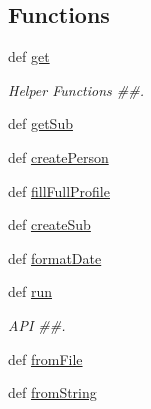 \subsection*{Functions}
\begin{DoxyCompactItemize}
\item 
def \hyperlink{namespacestudents_1_1linkedin__converter_a5b857dc4a26682e6e4112b430f85d0a1}{get}
\begin{DoxyCompactList}\small\item\em Helper Functions \#\#. \end{DoxyCompactList}\item 
def \hyperlink{namespacestudents_1_1linkedin__converter_a1b0420a55b9327dbde882ef39ec88c8d}{get\-Sub}
\item 
def \hyperlink{namespacestudents_1_1linkedin__converter_a508bd54255263358fc9b89c527b0be7f}{create\-Person}
\item 
def \hyperlink{namespacestudents_1_1linkedin__converter_a16da5f0b1783c410f527a823421de832}{fill\-Full\-Profile}
\item 
def \hyperlink{namespacestudents_1_1linkedin__converter_a9b47375845c60cee3339c9a402730503}{create\-Sub}
\item 
def \hyperlink{namespacestudents_1_1linkedin__converter_ae303061c29459c69df3dc09d6b495141}{format\-Date}
\item 
def \hyperlink{namespacestudents_1_1linkedin__converter_ae8ef886dcffd2847cd908b062a361ed6}{run}
\begin{DoxyCompactList}\small\item\em A\-P\-I \#\#. \end{DoxyCompactList}\item 
def \hyperlink{namespacestudents_1_1linkedin__converter_acbdadb1c069f1195fab80a95e41fad7e}{from\-File}
\item 
def \hyperlink{namespacestudents_1_1linkedin__converter_aca1591f6328656541c1fe74ad11067b6}{from\-String}
\end{DoxyCompactItemize}


